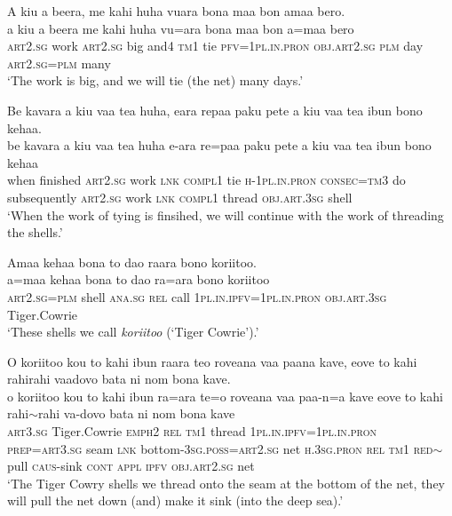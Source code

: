 \ea\label{ex:text20-23}
A kiu a beera, me kahi huha vuara bona maa bon amaa bero.\\
\gll a	kiu	a	beera	me	kahi	huha	vu=ara	bona	maa	bon	a=maa	bero\\
     \textsc{art}2.\textsc{sg}	work	\textsc{art}2.\textsc{sg}	big	and4	\textsc{tm}1	tie	\textsc{pfv}=1\textsc{pl}.\textsc{in}.\textsc{pron}	\textsc{obj}.\textsc{art}2.\textsc{sg}	\textsc{plm}	day	\textsc{art}2.\textsc{sg}=\textsc{plm}	many\\
\glt `The work is big, and we will tie (the net) many days.'
\z

\ea\label{ex:text20-24}
Be kavara a kiu vaa tea huha, eara repaa paku pete a kiu vaa tea ibun bono kehaa.\\
\gll be	kavara	a	kiu	vaa	tea	huha	e-ara	re=paa	paku	pete	a	kiu	vaa	tea	ibun	bono	kehaa\\
     when	finished	\textsc{art}2.\textsc{sg}	work	\textsc{lnk}	\textsc{compl}1	tie	\textsc{h}-1\textsc{pl}.\textsc{in}.\textsc{pron}	\textsc{consec}=\textsc{tm}3	do	subsequently	\textsc{art}2.\textsc{sg}	work	\textsc{lnk}	\textsc{compl}1	thread	\textsc{obj}.\textsc{art}.3\textsc{sg}	shell\\
\glt `When the work of tying is finsihed, we will continue with the work of threading the shells.'
\z

\ea\label{ex:text20-25}
Amaa kehaa bona to dao raara bono koriitoo.\\
\gll a=maa	kehaa	bona	to	dao	ra=ara	bono	koriitoo\\
     \textsc{art}2.\textsc{sg}=\textsc{plm}	shell	\textsc{ana}.\textsc{sg}	\textsc{rel}	call	1\textsc{pl}.\textsc{in}.\textsc{ipfv}=1\textsc{pl}.\textsc{in}.\textsc{pron}	\textsc{obj}.\textsc{art}.3\textsc{sg}	Tiger.Cowrie\\
\glt `These shells we call \textit{koriitoo} (`Tiger Cowrie').'
\z

\ea\label{ex:text20-26}
O koriitoo kou to kahi ibun raara teo roveana vaa paana kave, eove to kahi rahirahi vaadovo bata ni nom bona kave.\\
\gll o	koriitoo	kou	to	kahi	ibun	ra=ara	te=o	roveana	vaa	paa-n=a	kave	eove	to	kahi	rahi{$\sim$}rahi	va-dovo	bata	ni	nom	bona	kave\\
     \textsc{art}3.\textsc{sg}	Tiger.Cowrie	\textsc{emph}2	\textsc{rel}	\textsc{tm}1	thread	1\textsc{pl}.\textsc{in}.\textsc{ipfv}=1\textsc{pl}.\textsc{in}.\textsc{pron}	\textsc{prep}=\textsc{art}3.\textsc{sg}	seam	\textsc{lnk}	bottom-3\textsc{sg}.\textsc{poss}=\textsc{art}2.\textsc{sg}	net	\textsc{h}.3\textsc{sg}.\textsc{pron}	\textsc{rel}	\textsc{tm}1	\textsc{red}{$\sim$}pull	\textsc{caus}-sink	\textsc{cont}	\textsc{appl}	\textsc{ipfv}	\textsc{obj}.\textsc{art}2.\textsc{sg}	net\\
\glt `The Tiger Cowry shells we thread onto the seam at the bottom of the net, they will pull the net down (and) make it sink (into the deep sea).'
\z

